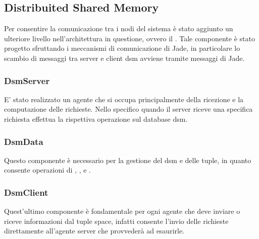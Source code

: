 \subsection{Distribuited Shared Memory}
Per consentire la comunicazione tra i nodi del sistema è stato aggiunto un ulteriore livello nell'architettura in questione, ovvero il . Tale componente è stato progetto sfruttando i meccanismi di comunicazione di Jade, in particolare lo scambio di messaggi tra server e client dsm avviene tramite messaggi di Jade.
\subsubsection{DsmServer}
E' stato realizzato un agente che si occupa principalmente della ricezione e la computazione delle richieste. Nello specifico quando il server riceve una specifica richiesta effettua la rispettiva operazione sul database dsm.
\subsubsection{DsmData}
Questo componente è necessario per la gestione del dsm e delle tuple, in quanto consente operazioni di , ,  e .
\subsubsection{DsmClient}
Quest'ultimo componente è fondamentale per ogni agente che deve inviare o riceve informazioni dal tuple space, infatti consente l'invio delle richieste direttamente all'agente server che provvederà ad esaurirle.
